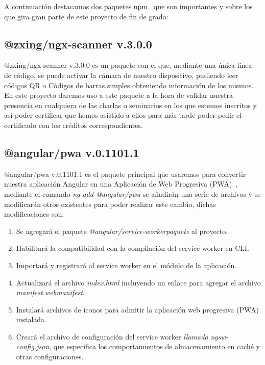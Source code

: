 \documentclass[a4paper, 12pt]{book}
\begin{document}
A continuación destacamos dos paquetes npm~\cite{NPM}  que son importantes y sobre los que gira gran parte de este proyecto de fin de grado:

\subsection{@zxing/ngx-scanner v.3.0.0}
\label{subsec:@zxing/ngx-scanner}
@zxing/ngx-scanner v.3.0.0 es un paquete con el que, mediante una única línea de código, se puede activar la cámara de nuestro dispositivo, pudiendo leer códigos QR o Códigos de barras simples obteniendo información de los mismos.
	En este proyecto daremos uso a este paquete a la hora de validar nuestra presencia en cualquiera de las charlas o seminarios en los que estemos inscritos y así poder certificar que hemos asistido a ellos para más tarde poder pedir el certificado con los créditos correspondientes.~\cite{ngx-scanner} 

\subsection{@angular/pwa v.0.1101.1}
\label{subsec:@angular/pwa}
@angular/pwa v.0.1101.1 es el paquete principal que usaremos para convertir nuestra aplicación Angular en una Aplicación de Web Progresiva (PWA)~\cite{pwa}, mediante el comando \textit{ng add @angular/pwa} se añadirán una serie de archivos y se modificarán otros existentes para poder realizar este cambio, dichas modificaciones son:

\begin{enumerate}
\item Se agregará el paquete \textit{@angular/service-workerpaquete} al proyecto.

\item Habilitará la compatibilidad con la compilación del service worker en CLI.

\item Importará y registrará al service worker en el módulo de la aplicación.

\item Actualizará el archivo \textit{index.html} incluyendo un enlace para agregar el archivo \textit{manifest.webmanifest}.

\item Instalará archivos de iconos para admitir la aplicación web progresiva (PWA) instalada.

\item Creará el archivo de configuración del service worker \textit{llamado ngsw-config.json}, que especifica los comportamientos de almacenamiento en caché y otras configuraciones.
\end{enumerate}
\end{document}
